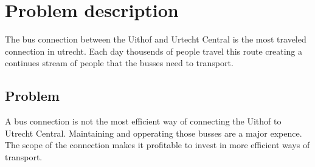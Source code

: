 \section{Problem description}

The bus connection between the Uithof and Urtecht Central is the most traveled connection in utrecht.
Each day thousends of people travel this route creating a continues stream of people that the busses
need to transport. 

\subsection{Problem}

A bus connection is not the most efficient way of connecting the Uithof to Utrecht Central. 
Maintaining and opperating those busses are a major expence. The scope of the connection makes it 
profitable to invest in more efficient ways of transport.
